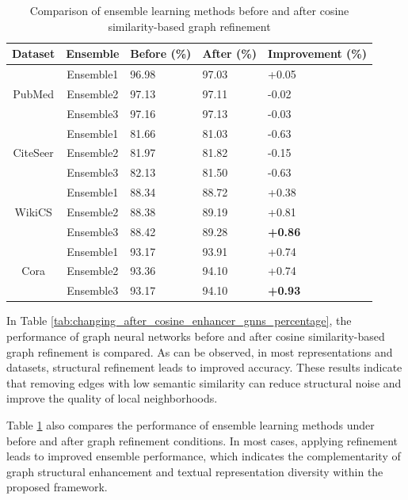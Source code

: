 \documentclass{article}
\begin{document}
\begin{table}[ht]
\centering
\caption{Comparison of ensemble learning methods before and after cosine similarity-based graph refinement}
\label{tab:changing_after_cosine_enhancer_ensembles}
\begin{tabularx}{\linewidth}{| c|| c | X | X | X|}
\hline
Dataset & Ensemble & Before (\%) & After (\%) & Improvement (\%) \\
\hline
\multirow{3}{*}{PubMed}
 & Ensemble1 & 96.98 & 97.03 & +0.05 \\
 & Ensemble2 & 97.13 & 97.11 & -0.02 \\
 & Ensemble3 & 97.16 & 97.13 & -0.03 \\
\hline
\hline
\multirow{3}{*}{CiteSeer}
 & Ensemble1 & 81.66 & 81.03 & -0.63 \\
 & Ensemble2 & 81.97 & 81.82 & -0.15 \\
 & Ensemble3 & 82.13 & 81.50 & -0.63 \\
\hline
\hline
\multirow{3}{*}{WikiCS}
 & Ensemble1 & 88.34 & 88.72 & +0.38 \\
 & Ensemble2 & 88.38 & 89.19 & +0.81 \\
 & Ensemble3 & 88.42 & 89.28 & \textbf{+0.86} \\
\hline
\hline
\multirow{3}{*}{Cora}
 & Ensemble1 & 93.17 & 93.91 & +0.74 \\
 & Ensemble2 & 93.36 & 94.10 & +0.74 \\
 & Ensemble3 & 93.17 & 94.10 & \textbf{+0.93} \\
\hline
\end{tabularx}
\end{table}

In Table \ref{tab:changing_after_cosine_enhancer_gnns_percentage},
the performance of graph neural networks before and after cosine similarity-based graph refinement is compared.
As can be observed,
in most representations and datasets,
structural refinement leads to improved accuracy.
These results indicate that removing edges with low semantic similarity
can reduce structural noise
and improve the quality of local neighborhoods.

Table \ref{tab:changing_after_cosine_enhancer_ensembles}
also compares the performance of ensemble learning methods
under before and after graph refinement conditions.
In most cases,
applying refinement leads to improved ensemble performance,
which indicates the complementarity of graph structural enhancement
and textual representation diversity within the proposed framework.
\end{document}
